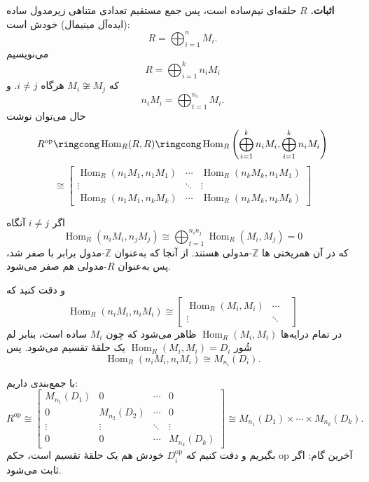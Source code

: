 \textbf{اثبات.}
$R$ حلقه‌ای نیم‌ساده است، پس جمع مستقیم تعدادی متناهی زیرمدول ساده (ایده‌آل مینیمال) خودش است:
\[
    R = \bigoplus_{i=1}^n M_i.
\]
می‌نویسیم
\[
    R = \bigoplus_{i=1}^k n_i M_i
\]
که $M_i \not\cong M_j$ هرگاه $i \neq j$. و
\[
    n_i M_i = \bigoplus_{t=1}^{n_i} M_i.
\]
حال می‌توان نوشت
\[
    R^{\mathrm{op}} \ringcong \operatorname{Hom}_R(R,R)
    \ringcong \operatorname{Hom}_R\left( \bigoplus_{i=1}^k n_i M_i , \bigoplus_{i=1}^k n_i M_i \right)
\]
\[
    \cong
    \begin{bmatrix}
        \operatorname{Hom}_R(n_1 M_1 , n_1 M_1) & \cdots & \operatorname{Hom}_R(n_k M_k , n_1 M_1) \\
        \vdots                                  & \ddots & \vdots                                  \\
        \operatorname{Hom}_R(n_1 M_1 , n_k M_k) & \cdots & \operatorname{Hom}_R(n_k M_k , n_k M_k)
    \end{bmatrix}
\]

اگر $i \neq j$ آنگاه
\[
    \operatorname{Hom}_R(n_i M_i , n_j M_j) \cong \bigoplus_{t=1}^{n_i n_j} \operatorname{Hom}_R(M_i , M_j) = 0
\]
که در آن همریختی ها
\(\mathbb{Z}\)-مدولی
هستند. از آنجا که به‌عنوان
\(\mathbb{Z}\)-مدول
برابر با صفر شد، پس به‌عنوان
\(R\)-مدولی
هم صفر ‌می‌شود.

و دقت کنید که
\[
    \operatorname{Hom}_R(n_i M_i , n_i M_i)
    \cong
    \begin{bmatrix}
        \operatorname{Hom}_R( M_i ,  M_i) & \cdots & \\
        \vdots                            & \ddots &
    \end{bmatrix}
\]
در تمام درایه‌ها $\operatorname{Hom}_R(M_i, M_i)$ ظاهر می‌شود که چون $M_i$ ساده است، بنابر لم شُور $\operatorname{Hom}_R(M_i, M_i) = D_i$ یک حلقهٔ تقسیم می‌شود. پس
\[
    \operatorname{Hom}_R(n_i M_i , n_i M_i) \cong M_{n_i}(D_i).
\]

با جمع‌بندی داریم:
\[
    R^{\mathrm{op}}
    \cong
    \begin{bmatrix}
        M_{n_1}(D_1) & 0            & \cdots & 0            \\
        0            & M_{n_2}(D_2) & \cdots & 0            \\
        \vdots       & \vdots       & \ddots & \vdots       \\
        0            & 0            & \cdots & M_{n_k}(D_k)
    \end{bmatrix}
    \cong M_{n_1}(D_1) \times \cdots \times M_{n_k}(D_k).
\]
آخرین گام: اگر $\mathrm{op}$ بگیریم و دقت کنیم که $D_i^{\mathrm{op}}$ خودش هم یک حلقهٔ تقسیم است، حکم ثابت می‌شود.
